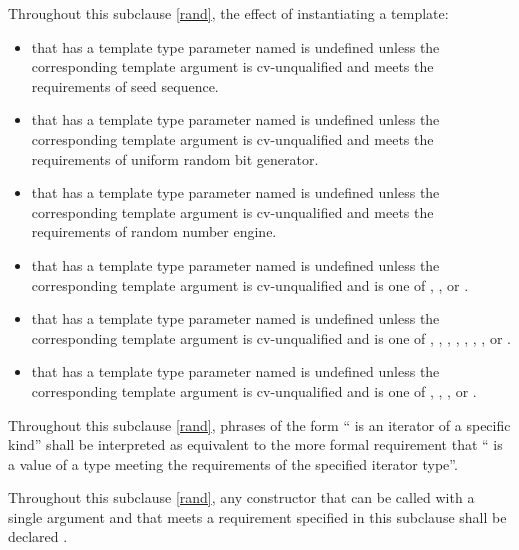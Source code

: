 \pnum
Throughout this subclause \ref{rand},
the effect of instantiating a template:
\begin{itemize}
  \item
    that has a template type parameter
    named 
    is undefined unless the corresponding template argument
    is cv-unqualified and
    meets the requirements
    of seed sequence.
  \item
    that has a template type parameter
    named 
    is undefined unless the corresponding template argument
    is cv-unqualified and
    meets the requirements
    of uniform random bit generator.
  \item
    that has a template type parameter
    named 
    is undefined unless the corresponding template argument
    is cv-unqualified and
    meets the requirements
    of random number engine.
  \item
    that has a template type parameter
    named 
    is undefined unless the corresponding template argument
    is cv-unqualified and
    is one of
    , , or .
  \item
    that has a template type parameter
    named 
    is undefined unless the corresponding template argument
    is cv-unqualified and
    is one of
      ,
      ,
      ,
      ,
      ,
      ,
      ,
      or
      .
  \item
    that has a template type parameter
    named 
    is undefined unless the corresponding template argument
    is cv-unqualified and
    is one of
      ,
      ,
      ,
      or
      .
\end{itemize}

\pnum
Throughout this subclause \ref{rand},
phrases of the form `` is an iterator of a specific kind''
shall be interpreted as equivalent to the more formal requirement that
`` is a value
of a type meeting the requirements
of the specified iterator type''.

\pnum
Throughout this subclause \ref{rand},
any constructor that can be called with a single argument
and that meets a requirement specified in this subclause
shall be declared .


